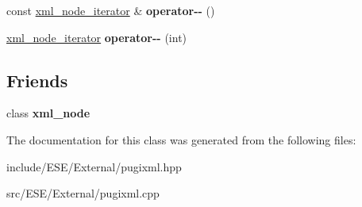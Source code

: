 \begin{DoxyCompactItemize}
\item 
\hypertarget{classpugi_1_1xml__node__iterator_a83ff5311f3d71c127e89a5cf6bf9d361}{const \hyperlink{classpugi_1_1xml__node__iterator}{xml\-\_\-node\-\_\-iterator} \& {\bfseries operator-\/-\/} ()}\label{classpugi_1_1xml__node__iterator_a83ff5311f3d71c127e89a5cf6bf9d361}

\item 
\hypertarget{classpugi_1_1xml__node__iterator_a85c3618b5bb64a3e8695335e80475804}{\hyperlink{classpugi_1_1xml__node__iterator}{xml\-\_\-node\-\_\-iterator} {\bfseries operator-\/-\/} (int)}\label{classpugi_1_1xml__node__iterator_a85c3618b5bb64a3e8695335e80475804}

\end{DoxyCompactItemize}
\subsection*{Friends}
\begin{DoxyCompactItemize}
\item 
\hypertarget{classpugi_1_1xml__node__iterator_a156d917a92815c7b593bd5ef19f6d5fb}{class {\bfseries xml\-\_\-node}}\label{classpugi_1_1xml__node__iterator_a156d917a92815c7b593bd5ef19f6d5fb}

\end{DoxyCompactItemize}


The documentation for this class was generated from the following files\-:\begin{DoxyCompactItemize}
\item 
include/\-E\-S\-E/\-External/pugixml.\-hpp\item 
src/\-E\-S\-E/\-External/pugixml.\-cpp\end{DoxyCompactItemize}
